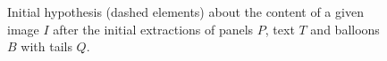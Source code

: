 \begin{figure}[h!] %
\begin{center}
 \hspace{0.5em}
\caption[Initial hypothesis about the content of a given image]{Initial hypothesis (dashed elements) about the content of a given image $I$ after the initial extractions of panels $P$, text $T$ and balloons $B$ with tails $Q$.
}
\label{fig:kn:graph0}
\end{center}
\end{figure}


